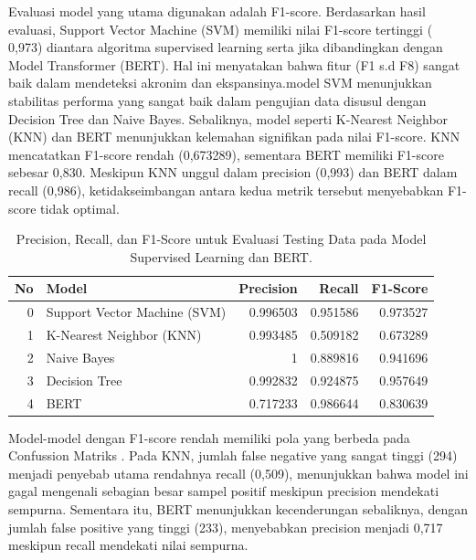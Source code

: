 \documentclass{article}\usepackage{float}
\begin{document}
Evaluasi model yang utama digunakan adalah F1-score. Berdasarkan hasil evaluasi, Support Vector Machine (SVM) memiliki nilai F1-score tertinggi ( 0,973) diantara algoritma supervised learning serta jika dibandingkan dengan Model Transformer (BERT).  Hal ini menyatakan bahwa fitur (F1 s.d F8) sangat baik dalam mendeteksi akronim dan ekspansinya.model SVM menunjukkan stabilitas performa yang sangat baik dalam pengujian data disusul dengan Decision Tree dan Naive Bayes. Sebaliknya, model seperti K-Nearest Neighbor (KNN) dan BERT menunjukkan kelemahan signifikan pada nilai F1-score. KNN mencatatkan F1-score rendah (0,673289), sementara BERT memiliki F1-score sebesar 0,830. Meskipun KNN unggul dalam precision (0,993) dan BERT dalam recall (0,986), ketidakseimbangan antara kedua metrik tersebut menyebabkan F1-score tidak optimal.
\begin{table}[h!]
\centering
\begin{tabular}{r|l|r|r|r}
\toprule
No & Model                        & Precision & Recall   & F1-Score \\ \midrule
0  & Support Vector Machine (SVM) & 0.996503  & 0.951586 & 0.973527 \\
1  & K-Nearest Neighbor (KNN)     & 0.993485  & 0.509182 & 0.673289 \\
2  & Naive Bayes                  & 1         & 0.889816 & 0.941696 \\
3  & Decision Tree                & 0.992832  & 0.924875 & 0.957649 \\
4  & BERT                         & 0.717233  & 0.986644 & 0.830639 \\ \bottomrule
\end{tabular}
\caption{\label{tab:metrics_testing} Precision, Recall, dan F1-Score untuk Evaluasi Testing Data pada Model Supervised Learning dan BERT.}
\end{table}


Model-model dengan F1-score rendah memiliki pola yang berbeda pada Confussion Matriks . Pada KNN, jumlah false negative yang sangat tinggi (294) menjadi penyebab utama rendahnya recall (0,509), menunjukkan bahwa model ini gagal mengenali sebagian besar sampel positif meskipun precision mendekati sempurna. Sementara itu, BERT menunjukkan kecenderungan sebaliknya, dengan jumlah false positive yang tinggi (233), menyebabkan precision menjadi 0,717 meskipun recall mendekati nilai sempurna.
\end{document}
